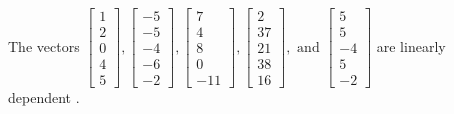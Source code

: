 \begin{exercise}
\begin{exerciseStatement}
  \end{exerciseStatement}
  \begin{exerciseAnswer}
   The vectors \(\left[\begin{array}{r}
1 \\
2 \\
0 \\
4 \\
5
\end{array}\right] , \left[\begin{array}{r}
-5 \\
-5 \\
-4 \\
-6 \\
-2
\end{array}\right] , \left[\begin{array}{r}
7 \\
4 \\
8 \\
0 \\
-11
\end{array}\right] , \left[\begin{array}{r}
2 \\
37 \\
21 \\
38 \\
16
\end{array}\right] , \text{ and } \left[\begin{array}{r}
5 \\
5 \\
-4 \\
5 \\
-2
\end{array}\right]\) are 
  	 linearly dependent  .
  


  \end{exerciseAnswer}
\end{exercise}